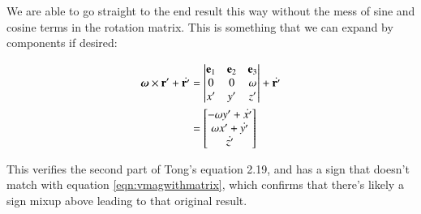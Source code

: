 \documentclass{article}      %
\newcommand{\dt}[1]{\dot{#1}}
\begin{document}
We are able to go straight to the end result this way without the mess
of sine and cosine terms in the rotation matrix.  This is something that
we can expand by components if desired:

\begin{align*}
\Bomega \cross \Br' + \dt{\Br'}
&= 
\begin{vmatrix}
\Be_1 & \Be_2 & \Be_3 \\
0 & 0 & \omega \\
x' & y' & z' \\
\end{vmatrix}
+ \dt{\Br'} \\
&=
\begin{bmatrix}
-\omega y' + \dt{x'} \\
\omega x' + \dt{y'} \\
 \dt{z'} \\
\end{bmatrix}
\end{align*}

This verifies the second part of Tong's equation 2.19, and has a sign that
doesn't match with equation \ref{eqn:vmagwithmatrix}, which confirms that
there's likely a sign mixup above leading to that original result.
\end{document}
